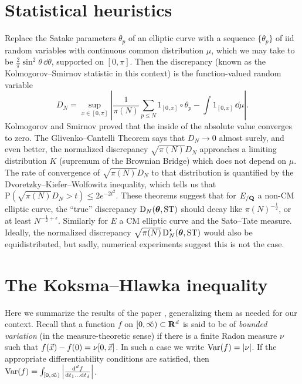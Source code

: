 \section{Statistical heuristics}

Replace the Satake parameters $\theta_p$ of an elliptic curve with 
a sequence $\{\theta_p\}$ of iid random variables with continuous common 
distribution 
$\mu$, which we may take to be $\frac{2}{\pi} \sin^2 \theta\, \dd\theta$, 
supported on $[0,\pi]$. Then the discrepancy (known as the 
Kolmogorov--Smirnov statistic in this context) is the function-valued random 
variable 
\[
	D_N = \sup_{x\in [0,\pi]} \left|\frac{1}{\pi(N)} \sum_{p\leqslant N} 1_{[0,x]}\circ \theta_p - \int 1_{[0,x]}\, \dd\mu\right| .
\]
Kolmogorov and Smirnov proved that the inside of the absolute value converges 
to zero. The Glivenko--Cantelli Theorem says that $D_N \to 0$ almost surely, 
and even better, the normalized discrepancy $\sqrt{\pi(N)} D_N$ approaches 
a limiting distribution $K$ (supremum of the Brownian Bridge) which does not 
depend on $\mu$. The rate of convergence of $\sqrt{\pi(N)} D_N$ to that 
distribution is quantified by the Dvoretzky--Kiefer--Wolfowitz inequality, 
which tells us that 
$\mathrm{P}\left(\sqrt{\pi(N)} D_N > t\right) \leqslant 2 e^{-2 t^2}$. 
These theorems suggest that for $E_{/\mathbf{Q}}$ a non-CM elliptic 
curve, the ``true'' discrepancy $\operatorname{D}_N({\boldsymbol\theta},\mathrm{ST})$ should decay 
like $\pi(N)^{-\frac 1 2}$, or at least $N^{-\frac 1 2+\epsilon}$. Similarly 
for $E$ a CM elliptic curve and the Sato--Tate measure. Ideally, the 
normalized discrepancy $\sqrt{\pi(N)}\operatorname{D}_N^\star({\boldsymbol\theta},\mathrm{ST})$ would also 
be equidistributed, but sadly, numerical experiments suggest this is not the 
case. 





\section{The Koksma--Hlawka inequality}

Here we summarize the results of the paper \cite{okten-1999}, generalizing them 
as needed for our context. Recall that a function $f$ on 
$[0,\vec{\infty})\subset \mathbf{R}^d$ is said to be of \emph{bounded variation} (in the 
measure-theoretic sense) if there is a finite Radon measure $\nu$ such that 
$f(\vec{x}) - f(0) = \nu[0,\vec{x}]$. In such a case we write $\operatorname{Var}(f) = |\nu|$. If 
the appropriate differentiability conditions are satisfied, then 
$\operatorname{Var}(f) = \int_{[0,\vec{\infty})} \left|\frac{\mathrm{d}^d f}{\mathrm{d} t_1 \dots \mathrm{d} t_d} \right|$. 

